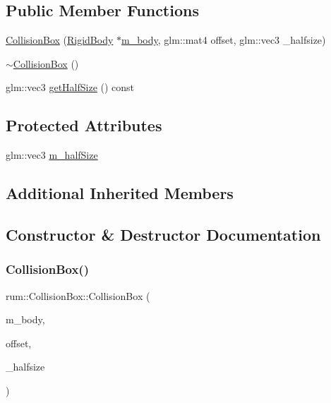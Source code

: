 \subsection*{Public Member Functions}
\begin{DoxyCompactItemize}
\item 
\hyperlink{classrum_1_1_collision_box_a700f72696623dc264a0ac1b187329c4e}{Collision\+Box} (\hyperlink{classrum_1_1_rigid_body}{Rigid\+Body} $\ast$\hyperlink{classrum_1_1_collision_primitive_a9ef6e9862ac5e75330395368e401530e}{m\+\_\+body}, glm\+::mat4 offset, glm\+::vec3 \+\_\+halfsize)
\item 
\hyperlink{classrum_1_1_collision_box_a3e480bda7dc21dad54dbc18bf38a7da3}{$\sim$\+Collision\+Box} ()
\item 
glm\+::vec3 \hyperlink{classrum_1_1_collision_box_a41fd485b6fc134f77a83efba31f19543}{get\+Half\+Size} () const
\end{DoxyCompactItemize}
\subsection*{Protected Attributes}
\begin{DoxyCompactItemize}
\item 
glm\+::vec3 \hyperlink{classrum_1_1_collision_box_ac154420e43adf96a09bd6d1340987bb5}{m\+\_\+half\+Size}
\end{DoxyCompactItemize}
\subsection*{Additional Inherited Members}


\subsection{Constructor \& Destructor Documentation}
\mbox{\label{classrum_1_1_collision_box_a700f72696623dc264a0ac1b187329c4e}} 
\subsubsection{\texorpdfstring{Collision\+Box()}{CollisionBox()}}
{\footnotesize\ttfamily rum\+::\+Collision\+Box\+::\+Collision\+Box (\begin{DoxyParamCaption}\item[{\hyperlink{classrum_1_1_rigid_body}{Rigid\+Body} $\ast$}]{m\+\_\+body,  }\item[{glm\+::mat4}]{offset,  }\item[{glm\+::vec3}]{\+\_\+halfsize }\end{DoxyParamCaption})}

